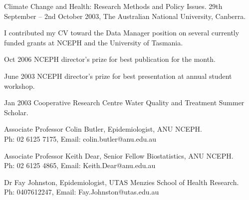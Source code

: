 \documentclass[a4paper,11pt]{article}
\begin{document}
\ind Climate Change and Health: Research Methods and Policy Issues.  29th September – 2nd  October 2003, The Australian National University, Canberra.


\bigskip

\medskip
\noindent I contributed my CV toward the Data Manager position on several currently funded grants at NCEPH and the University of Tasmania.
  
\ind Oct 2006 NCEPH director’s prize for best publication for the month.

\ind June 2003 NCEPH director’s prize for best presentation at annual student workshop.

\ind Jan 2003 Cooperative Research Centre Water Quality and Treatment Summer Scholar.

\bigskip 


\medskip

\medskip

\ind Associate Professor Colin Butler, Epidemiologist, ANU NCEPH.  \\ Ph: 02 6125 7175, Email: colin.butler@anu.edu.au

\ind Associate Professor Keith Dear, Senior Fellow Biostatistics, ANU NCEPH. \\ Ph: 02 6125 4865, Email: Keith.Dear@anu.edu.au

\ind Dr Fay Johnston, Epidemiologist, UTAS Menzies School of Health Research. \\ Ph: 0407612247, Email: Fay.Johnston@utas.edu.au
\end{document}
